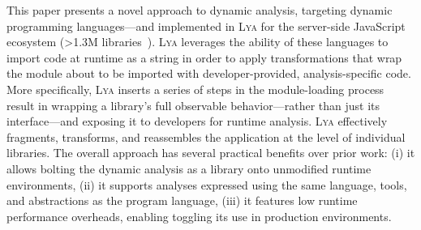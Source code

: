 \documentclass[letterpaper,twocolumn,10pt]{article}
\newcommand{\heading}[1]{\vspace{2pt}\noindent\textbf{#1}\enspace}
\newcommand{\sys}{{\scshape Lya}\xspace}
\begin{document}
This paper presents a novel approach to dynamic analysis, targeting dynamic programming languages---and implemented in \sys for the server-side JavaScript ecosystem (>1.3M libraries~\cite{modulecounts}). 
\sys leverages the ability of these languages to import code at runtime as a string in order to apply transformations that wrap the module about to be imported with developer-provided, analysis-specific code.
More specifically, \sys inserts a series of steps in the module-loading process result in wrapping a library's full observable behavior---rather than just its interface---and exposing it to developers for runtime analysis.
\sys effectively fragments, transforms, and reassembles the application at the level of individual libraries. 
The overall approach has several practical benefits over prior work:
  (i) it allows bolting the dynamic analysis as a library  onto unmodified runtime environments,
  (ii) it supports analyses expressed using the same language, tools, and abstractions as the program language,
  (iii) it features low runtime performance overheads, enabling toggling its use in production environments.

% 
% 
\end{document}
